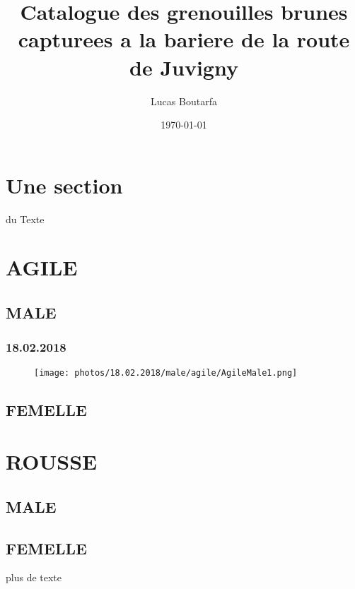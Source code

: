\documentclass{article}%
\title{Catalogue des grenouilles brunes\newline%
        capturees a la bariere de la route de Juvigny}%
\author{Lucas Boutarfa}%
\date{\today}%
\begin{document}
%
\normalsize%
\maketitle%
\section{Une section}%
du Texte%
\section{AGILE}%
\subsection{MALE}%
\subsubsection{18.02.2018}%


\begin{figure}%
\centering%
\texttt{[image: photos/18.02.2018/male/agile/AgileMale1.png]}%
\end{figure}

%
\subsection{FEMELLE}%

%
\section{ROUSSE}%
\subsection{MALE}%

%
\subsection{FEMELLE}%

%
plus de texte%
\end{document}
